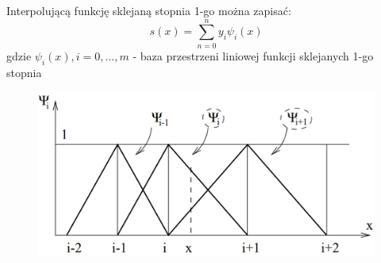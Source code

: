    \begin{frame}
   		\begin{exampleblock}{}
   			Interpolującą funkcję sklejaną stopnia 1-go można zapisać:
            \[
            	s(x)=\sum_{n=0}^{n}y_{i}\psi_{i}(x)
            \]
            gdzie $\psi_{i}(x), i=0,...,m$ - baza przestrzeni liniowej funkcji sklejanych
            1-go stopnia
   		\end{exampleblock}
        \begin{figure}[h]
			\includegraphics[width=.65\linewidth]{img/4/spline_img_3}
		\end{figure}
   \end{frame}
    
    
    
    
    
    
    
    
    
    
    
    
    
    
    
    
    
    